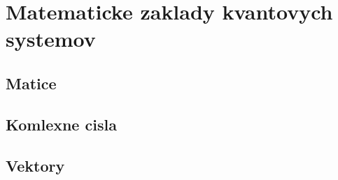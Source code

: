
\chapter{Matematicke zaklady kvantovych systemov}

\section{Matice}
\section{Komlexne cisla}
\section{Vektory}
